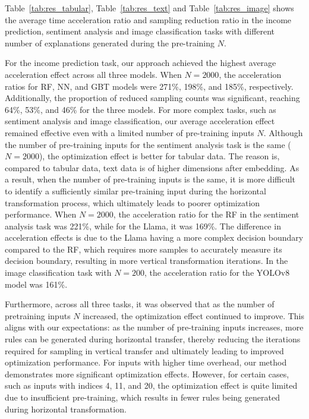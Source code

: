 Table~\ref{tab:res_tabular}, Table~\ref{tab:res_text} and Table~\ref{tab:res_image} shows the average time acceleration ratio and sampling reduction ratio in the income prediction, sentiment analysis and image classification tasks with different number of explanations generated during the pre-training \(N\). 

For the income prediction task, our approach achieved the highest average acceleration effect across all three models. When \( N = 2000 \), the acceleration ratios for RF, NN, and GBT models were 271\%, 198\%, and 185\%, respectively. Additionally, the proportion of reduced sampling counts was significant, reaching 64\%, 53\%, and 46\% for the three models. 
%
For more complex tasks, such as sentiment analysis and image classification, our average acceleration effect remained effective even with a limited number of pre-training inputs \(N\). Although the number of pre-training inputs for the sentiment analysis task is the same (\(N=2000\)), the optimization effect is better for tabular data. The reason is, compared to tabular data, text data is of higher dimensions after embedding. As a result, when the number of pre-training inputs is the same, it is more difficult to identify a sufficiently similar pre-training input during the horizontal transformation process, which ultimately leads to poorer optimization performance.
%
When \( N = 2000 \), the acceleration ratio for the RF in the sentiment analysis task was 221\%, while for the Llama, it was 169\%. The difference in acceleration effects is due to the Llama having a more complex decision boundary compared to the RF, which requires more samples to accurately measure its decision boundary, resulting in more vertical transformation iterations. In the image classification task with \( N = 200 \), the acceleration ratio for the YOLOv8 model was 161\%. 

Furthermore, across all three tasks, it was observed that as the number of pretraining inputs \( N \) increased, the optimization effect continued to improve. This aligns with our expectations: as the number of pre-training inputs increases, more rules can be generated during horizontal transfer, thereby reducing the iterations required for sampling in vertical transfer and ultimately leading to improved optimization performance. 
%
For inputs with higher time overhead, our method demonstrates more significant optimization effects. However, for certain cases, such as inputs with indices 4, 11, and 20, the optimization effect is quite limited due to insufficient pre-training, which results in fewer rules being generated during horizontal transformation.

